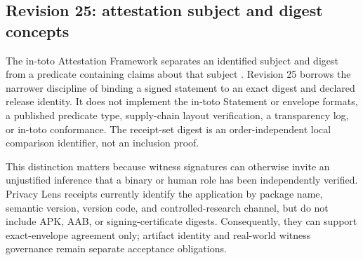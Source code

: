 

\subsection{Revision 25: attestation subject and digest concepts}

The in-toto Attestation Framework separates an identified subject and digest from a predicate containing claims about that subject \cite{intotoattestation}. Revision 25 borrows the narrower discipline of binding a signed statement to an exact digest and declared release identity. It does not implement the in-toto Statement or envelope formats, a published predicate type, supply-chain layout verification, a transparency log, or in-toto conformance. The receipt-set digest is an order-independent local comparison identifier, not an inclusion proof.

This distinction matters because witness signatures can otherwise invite an unjustified inference that a binary or human role has been independently verified. Privacy Lens receipts currently identify the application by package name, semantic version, version code, and controlled-research channel, but do not include APK, AAB, or signing-certificate digests. Consequently, they can support exact-envelope agreement only; artifact identity and real-world witness governance remain separate acceptance obligations.

